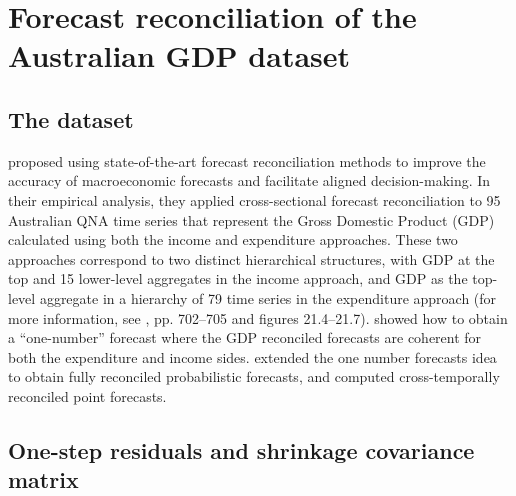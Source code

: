 \documentclass[a4paper,11pt]{article}
\theoremstyle{definition}
\begin{document}
\begin{table}[H]
	\centering
	\begingroup
	\fontsize{9}{11}\selectfont
	
	\endgroup
	\caption{Simulation experiment. ES ratio indices defined in Section 5. %
	Approaches performing worse than the benchmark (bootstrap base forecasts, ctjb) are highlighted in red, the best for each column is marked in bold, and the overall lowest value is highlighted in blue. The reconciliation approaches are described in Table 2.}
	\label{tab:ar2es_app_shr}
\end{table}

\newpage
\section{Forecast reconciliation of the Australian GDP dataset}
\setcounter{table}{0} 

\subsection{The dataset}
\cite{athanasopoulos2020} proposed using state-of-the-art forecast reconciliation methods to improve the accuracy of macroeconomic forecasts and facilitate aligned decision-making. 
In their empirical analysis, they applied cross-sectional forecast reconciliation to 95 Australian QNA time series that represent the Gross Domestic Product (GDP) calculated using both the income and expenditure approaches. These two approaches correspond to two distinct hierarchical structures, with GDP at the top and 15 lower-level aggregates in the income approach, and GDP as the top-level aggregate in a hierarchy of 79 time series in the expenditure approach (for more information, see \citealp{athanasopoulos2020}, pp. 702--705 and figures 21.4--21.7).
\cite{bisaglia2020} showed how to obtain a ``one-number'' forecast where the GDP reconciled forecasts are coherent for both the expenditure and income sides.
\cite{difonzo2022c, giro2022} extended the one number forecasts idea to obtain fully reconciled probabilistic forecasts, and \cite{difonzo2023} computed cross-temporally reconciled point forecasts. 

\subsection{One-step residuals and shrinkage covariance matrix}
\begin{table}[H]
	\centering
	\begingroup
	\fontsize{8}{10}\selectfont
	
	\endgroup
	\caption{$\overline{RelCRPS}$ indices defined in Section 5 for the Australian QNA dataset. %
	Approaches performing worse than the benchmark (bootstrap base forecasts, ctjb) are highlighted in red, the best for each column is marked in bold, and the overall lowest value is highlighted in blue. The reconciliation approaches are described in Table 2.}
	\label{tab:auscrps}
\end{table}
\end{document}

